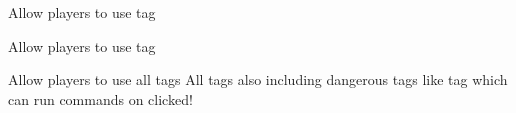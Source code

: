 \begin{example}{Allow players to use  tag}
\end{example}

\begin{example}{Allow players to use  tag}
\end{example}

\begin{example}{Allow players to use all tags}
    All tags also including dangerous tags like  tag which can run commands on clicked!\\
\end{example}
